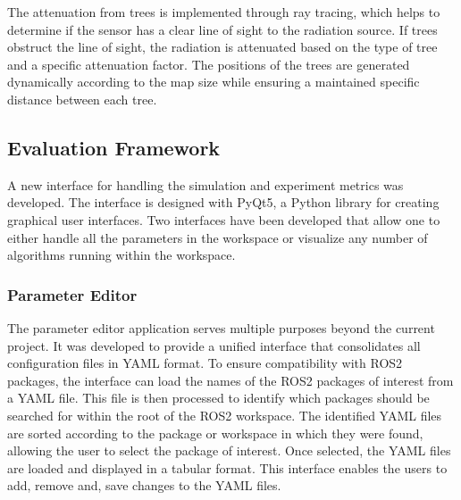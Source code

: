 \documentclass[../report.tex]{subfiles}
\begin{document}
    The attenuation from trees is implemented through ray tracing, which helps to determine if the sensor has a clear line of sight to the radiation source. If trees obstruct the line of sight, 
    the radiation is attenuated based on the type of tree and a specific attenuation factor. The positions of the trees are generated dynamically according to the map size while ensuring a 
    maintained specific distance between each tree.
        



    \subsection{Evaluation Framework}

    A new interface for handling the simulation and experiment metrics was developed. The interface is designed with PyQt5, a Python library for creating graphical user interfaces. 
    Two interfaces have been developed that allow one to either handle all the parameters in the workspace or visualize any number of algorithms running within the workspace.
        
    \subsubsection{Parameter Editor}
    The parameter editor application serves multiple purposes beyond the current project. It was developed to provide a unified interface that consolidates all configuration files in YAML format. 
    To ensure compatibility with ROS2 packages, the interface can load the names of the ROS2 packages of interest from a YAML file. This file is then processed to identify which packages should be
     searched for within the root of the ROS2 workspace. The identified YAML files are sorted according to the package or workspace in which they were found, allowing the user to select the 
     package of interest. Once selected, the YAML files are loaded and displayed in a tabular format. This interface enables the users to add, remove and, save changes to the YAML files.  
\end{document}
